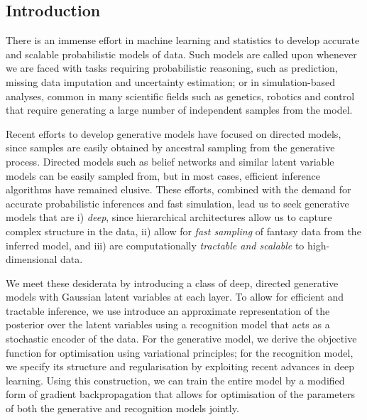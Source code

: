 \documentclass{article}
\begin{document}
\begin{bibunit}[icml2013]
\section{Introduction}
\label{sec:introduction}
There is an immense effort in machine learning and statistics to develop 
accurate and scalable probabilistic models of data. Such models are called 
upon whenever we are faced with tasks requiring probabilistic reasoning, 
such as prediction, missing data imputation and uncertainty estimation; or 
in simulation-based analyses, common in many scientific fields such as genetics, 
robotics and control that require generating a large number of 
independent samples from the model.

Recent efforts to develop generative models have focused on directed models, 
since samples are easily obtained by ancestral sampling from the generative 
process. Directed models such as belief networks and similar latent variable 
models \citep{dayan1995, frey1996, saul1996mean, book:bartholomew, 
uria2013, gregor2013} can be easily sampled from, but in most cases, efficient 
inference algorithms have remained elusive.
These efforts, combined with the demand for accurate probabilistic inferences 
and fast simulation, lead us to seek generative models that are
i) \textit{deep}, since hierarchical architectures allow us to capture complex 
structure in the data,
ii)  allow for \textit{fast sampling} of fantasy data from the inferred model, and
iii) are computationally \textit{tractable and scalable} to high-dimensional 
data. 

We meet these desiderata by introducing a class of deep, directed generative models with Gaussian latent variables at each layer. To allow for efficient and tractable inference, we 
use introduce an approximate representation of the posterior over the latent variables using a recognition model that acts as a stochastic encoder of the data.
For the generative model, we derive the objective function for optimisation using variational principles; for the recognition model, we specify its structure and regularisation by exploiting recent advances in deep learning. 
Using this construction, we can train the entire model by a modified form of gradient 
backpropagation that allows for optimisation of the parameters of  both the 
generative and recognition models jointly. 


\end{bibunit}
\end{document}
